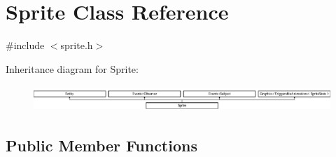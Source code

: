 \hypertarget{class_sprite}{}\section{Sprite Class Reference}
\label{class_sprite}


{\ttfamily \#include $<$sprite.\+h$>$}

Inheritance diagram for Sprite\+:\begin{figure}[H]
\begin{center}
\leavevmode
\includegraphics[height=0.972222cm]{class_sprite}
\end{center}
\end{figure}
\subsection*{Public Member Functions}
